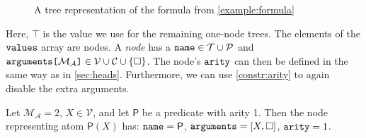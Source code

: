 \documentclass[runningheads]{llncs}
\newcommand{\variable}[1]{\texttt{\textup{#1}}}
\newcommand{\arrayd}[3]{\variable{{#1}[}{#2}\variable{]} \in {#3}}
\newcommand{\predicates}{\mathcal{P}}
\newcommand{\variables}{\mathcal{V}}
\newcommand{\constants}{\mathcal{C}}
\newcommand{\tokens}{\mathcal{T}}
\newcommand{\maxArity}{\mathcal{M}_{\mathcal{A}}}
\begin{document}
\begin{figure}[t]
  \centering
  \caption{A tree representation of the formula from \cref{example:formula}}
  \label{fig:example_tree}
\end{figure}

Here, $\top$ is the value we use for the remaining one-node trees. The
elements of the $\variable{values}$ array are nodes. A \emph{node} has a
$\variable{name} \in \tokens{} \cup \predicates{}$ and
$\arrayd{arguments}{\maxArity{}}{\variables{} \cup \constants{} \cup \{ \Box
  \}}$. The node's $\variable{arity}$ can then be defined in the same way as in
\cref{sec:heads}. Furthermore, we can use \cref{constr:arity} to again disable
the extra arguments.

\begin{example}
  Let $\maxArity{} = 2$, $X \in \variables{}$, and let $\mathsf{P}$ be a
  predicate with arity 1. Then the node representing atom $\mathsf{P}(X)$ has:
    $\variable{name} = \mathsf{P}$, $\variable{arguments} = [X, \Box]$,
    $\variable{arity} = 1$.
\end{example}
\end{document}
